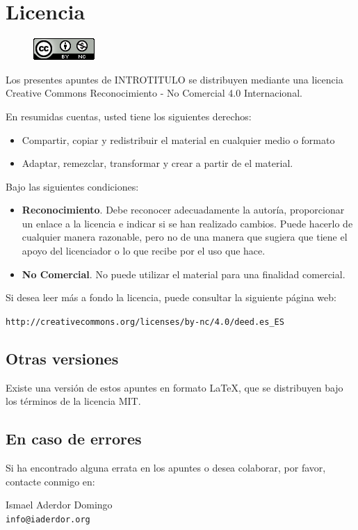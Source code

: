 \documentclass[{../apuntes.tex}]{subfiles}
\begin{document}
\chapter{Licencia}

\begin{figure}[h]
	\includegraphics{img/licencia.png}
\end{figure}


Los presentes apuntes de INTROTITULO se distribuyen mediante una licencia Creative Commons Reconocimiento - No Comercial 4.0 Internacional.



En resumidas cuentas, usted tiene los siguientes derechos:

\begin{itemize}
	\item Compartir, copiar y redistribuir el material en cualquier medio o formato
	\item Adaptar, remezclar, transformar y crear a partir de el material.
\end{itemize}

Bajo las siguientes condiciones:

\begin{itemize}
	\item \textbf{Reconocimiento}. Debe reconocer adecuadamente la autoría, proporcionar un enlace a la licencia e indicar si se han realizado cambios. Puede hacerlo de cualquier manera razonable, pero no de una manera que sugiera que tiene el apoyo del licenciador o lo que recibe por el uso que hace.
	\item \textbf{No Comercial}. No puede utilizar el material para una finalidad comercial.
\end{itemize}

Si desea leer más a fondo la licencia, puede consultar la siguiente página web:


\begin{center}
\texttt{http://creativecommons.org/licenses/by-nc/4.0/deed.es\_ES}
\end{center}


\section*{Otras versiones}

Existe una versión de estos apuntes en formato \LaTeX, que se distribuyen bajo los términos de la licencia MIT.

\section*{En caso de errores}

Si ha encontrado alguna errata en los apuntes o desea colaborar, por favor, contacte conmigo en:

\begin{center}
		Ismael Aderdor Domingo \\
		\texttt{info@iaderdor.org}
\end{center}
\end{document}
